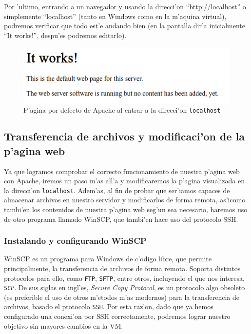 \documentclass[11pt]{article}
\begin{document}
		Por 'ultimo, entrando a un navegador y usando la direcci'on ``http://localhost'' o simplemente ``localhost'' (tanto en Windows como en la m'aquina virtual), podremos verificar que todo est'e andando bien (en la pantalla dir'a inicialmente  ``It works!'', despu'es podremos editarlo).
		
	\begin{figure}[H]
		\centering
		\includegraphics[width=.8\linewidth]{Images/Apache/fig7.png}
		\caption{P'agina por defecto de Apache al entrar a la direcci'on \texttt{localhost}}
		\label{fig:6}
	\end{figure}
		
	\subsection{Transferencia de archivos y modificaci'on de la p'agina web}
	
	Ya que logramos comprobar el correcto funcionamiento de nuestra p'agina web con Apache, iremos un paso m'as all'a y modificaremos la p'agina visualizada en la direcci'on \texttt{localhost}. Adem'as, al fin de probar que ser'iamos capaces de almacenar archivos en nuestro servidor y modificarlos de forma remota, as'icomo tambi'en los contenidos de nuestra p'agina web seg'un sea necesario, haremos uso de otro programa llamado WinSCP, que tambi'en hace uso del protocolo SSH.
	
	\subsubsection{Instalando y configurando WinSCP}
	
	WinSCP es un programa para Windows de c'odigo libre, que permite principalmente, la transferencia de archivos de forma remota. Soporta distintos protocolos para ello, como \texttt{FTP}, \texttt{SFTP}, entre otros, incluyendo el que nos interesa, \texttt{\em{SCP}}. De sus siglas en ingl'es, \textit{Secure Copy Protocol}, es un protocolo algo obsoleto (es preferible el uso de otros m'etodos m'as modernos) para la transferencia de archivos, basado el protocolo \texttt{SSH}. Por esta raz'on, dado que ya hemos configurado una conexi'on por SSH correctamente, podremos lograr nuestro objetivo sin mayores cambios en la VM.
	
\end{document}

